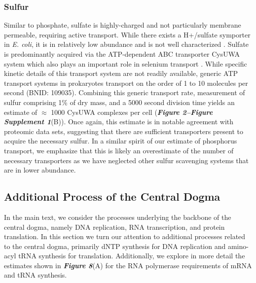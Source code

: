 \subsubsection{Sulfur}
Similar to phosphate, sulfate is highly-charged and not particularly membrane
permeable, requiring active transport. While there exists a H+/sulfate
symporter in \textit{E. coli}, it is in relatively low abundance and is not
well characterized \citep{zhang2014}. Sulfate is predominantly acquired via
the ATP-dependent ABC transporter CysUWA system which also plays an important
role in selenium transport \citep{sekowska2000, sirko1995}. While specific
kinetic details of this transport system are not readily available, generic
ATP transport systems in prokaryotes transport on the order of 1 to 10
molecules per second (BNID: 109035). Combining this generic transport rate,
measurement of sulfur comprising 1\% of dry mass, and a 5000 second division
time yields an estimate of $\approx$ 1000 CysUWA complexes per cell
(\textbf{\textit{Figure 2–Figure Supplement 1}}(B)). Once again, this estimate is in notable
agreement with proteomic data sets, suggesting that there are sufficient
transporters present to acquire the necessary sulfur. In a similar spirit of
our estimate of phosphorus transport, we emphasize that this is likely an
overestimate of the number of necessary transporters as we have neglected
other sulfur scavenging systems that are in lower abundance.



\subsection{Additional Process of the Central Dogma}
\label{sec:SI_central_dogma}
In the main text, we consider the processes underlying the backbone of the
central dogma, namely DNA replication, RNA transcription, and protein
translation. In this section we turn our attention to additional processes
related to the central dogma, primarily dNTP synthesis for DNA replication and
amino-acyl tRNA synthesis for translation. Additionally, we explore in more
detail the estimates shown in \textbf{\textit{Figure 8}}(A) for the RNA polymerase
requirements of mRNA and tRNA synthesis.


